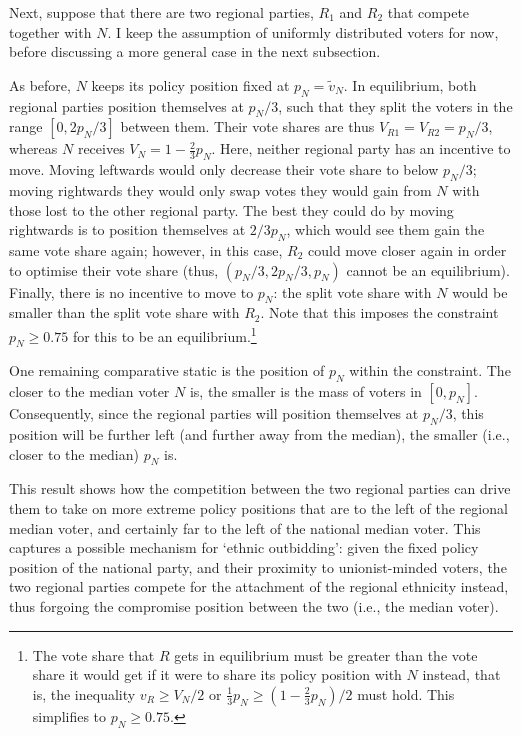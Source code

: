 \documentclass[11pt]{article}
\begin{document}
Next, suppose that there are two regional parties, $R_1$ and $R_2$ that compete together with $N$. I keep the assumption of uniformly distributed voters for now, before discussing a more general case in the next subsection.

As before, $N$ keeps its policy position fixed at $p_N = \tilde{v}_N$. In equilibrium, both regional parties position themselves at $p_N / 3$, such that they split the voters in the range $[0, 2 p_N/3]$ between them. Their vote shares are thus $V_{R1} = V_{R2} = p_N / 3$, whereas $N$ receives $V_N = 1 - \frac{2}{3} p_N$. Here, neither regional party has an incentive to move. Moving leftwards would only decrease their vote share to below $p_N / 3$; moving rightwards they would only swap votes they would gain from $N$ with those lost to the other regional party. The best they could do by moving rightwards is to position themselves at $2/3 p_N$, which would see them gain the same vote share again; however, in this case, $R_2$ could move closer again in order to optimise their vote share (thus, $(p_N / 3, 2 p_N/3, p_N) $ cannot be an equilibrium). Finally, there is no incentive to move to $p_N$: the split vote share with $N$ would be smaller than the split vote share with $R_2$. Note that this imposes the constraint $p_N \geq 0.75$ for this to be an equilibrium.\footnote{The vote share that $R$ gets in equilibrium must be greater than the vote share it would get if it were to share its policy position with $N$ instead, that is, the inequality $v_R \geq V_N / 2$ or $\frac{1}{3} p_N \geq (1 - \frac{2}{3} p_N) / 2$ must hold. This simplifies to $p_N \geq 0.75$.}

One remaining comparative static is the position of $p_N$ within the constraint. The closer to the median voter $N$ is, the smaller is the mass of voters in $[0, p_N]$. Consequently, since the regional parties will position themselves at $p_N / 3$, this position will be further left (and further away from the median), the smaller (i.e., closer to the median) $p_N$ is.

This result shows how the competition between the two regional parties can drive them to take on more extreme policy positions that are to the left of the regional median voter, and certainly far to the left of the national median voter. This captures a possible mechanism for `ethnic outbidding': given the fixed policy position of the national party, and their proximity to unionist-minded voters, the two regional parties compete for the attachment of the regional ethnicity instead, thus forgoing the compromise position between the two (i.e., the median voter).
\end{document}
